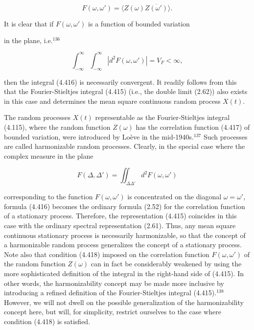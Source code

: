 \documentclass{article}
\begin{document}
\begin{equation}
F(\omega,\omega') = \langle Z(\omega)\overline{Z(\omega')} \rangle.
\end{equation}

It is clear that if $F(\omega,\omega')$ is a function of bounded variation

\newpage

in the plane, i.e.$^{136}$

\begin{equation}
\int_{-\infty}^{\infty}\int_{-\infty}^{\infty} |d^2F(\omega,\omega')| = V_F < \infty,
\end{equation}

then the integral (4.416) is necessarily convergent. It readily follows from this that the Fourier-Stieltjes integral (4.415) (i.e., the double limit (2.62)) also exists in this case and determines the mean square continuous random process $X(t)$.

The random processes $X(t)$ representable as the Fourier-Stieltjes integral (4.115), where the random function $Z(\omega)$ has the correlation function (4.417) of bounded variation, were introduced by Loève in the mid-1940s.$^{137}$ Such processes are called harmonizable random processes. Clearly, in the special case where the complex measure in the plane

\begin{equation}
F(\Delta,\Delta') = \iint_{\Delta \Delta'} d^2F(\omega,\omega')
\end{equation}

corresponding to the function $F(\omega,\omega')$ is concentrated on the diagonal $\omega = \omega'$, formula (4.416) becomes the ordinary formula (2.52) for the correlation function of a stationary process. Therefore, the representation (4.415) coincides in this case with the ordinary spectral representation (2.61). Thus, any mean square continuous stationary process is necessarily harmonizable, so that the concept of a harmonizable random process generalizes the concept of a stationary process. Note also that condition (4.418) imposed on the correlation function $F(\omega,\omega')$ of the random function $Z(\omega)$ can in fact be considerably weakened by using the more sophisticated definition of the integral in the right-hand side of (4.415). In other words, the harmonizability concept may be made more inclusive by introducing a refined definition of the Fourier-Stieltjes integral (4.415).$^{138}$ However, we will not dwell on the possible generalization of the harmonizability concept here, but will, for simplicity, restrict ourselves to the case where condition (4.418) is satisfied.
\end{document}
